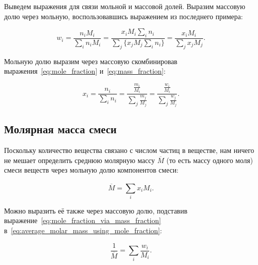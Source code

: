 Выведем выражения для связи мольной и массовой долей. Выразим массовую долю через мольную, воспользовавшись выражением из последнего примера:

\begin{equation}
    w_i  = \frac{n_iM_i}{\sum_{i}^{}n_iM_i} = \frac{x_iM_i\sum_{i}^{}n_i}{\sum_{j}^{}\{ x_jM_j\sum_{i}^{}n_i\}} = \frac{x_iM_i}{\sum_{j}^{}x_jM_j}.
\end{equation}

Мольную долю выразим через массовую скомбинировав выражения~\eqref{eq:mole_fraction} и~\eqref{eq:mass_fraction}:

\begin{equation}
    \label{eq:mole_fraction_via_mass_fraction}
    x_i = \frac{n_i}{\sum_{i}^{} n_i} = \frac{\frac{m_i}{M_i}}{\sum_{j}^{}\frac{m_j}{M_j}} = \frac{\frac{w_i}{M_i}}{\sum_{j}^{}\frac{w_j}{M_j}}.
\end{equation}

\subsection*{\protect{} Молярная масса смеси}\label{term:average_molar_mass}

Поскольку количество вещества связано с числом частиц в веществе, нам ничего не мешает определить среднюю молярную массу $\overline{M}$ (то есть массу одного моля) смеси веществ через мольную долю компонентов смеси:

\begin{equation}
    \label{eq:average_molar_mass_using_mole_fraction}
    \overline{M} = \sum_{i}^{} x_iM_i.
\end{equation}

Можно выразить её также через массовую долю, подставив выражение~\eqref{eq:mole_fraction_via_mass_fraction} в~\eqref{eq:average_molar_mass_using_mole_fraction}:

\begin{equation}
    \label{eq:average_molar_mass_using_mass_fraction}
    \frac{1}{\overline{M}} = \sum_{i}^{} \frac{w_i}{M_i}.
\end{equation}

